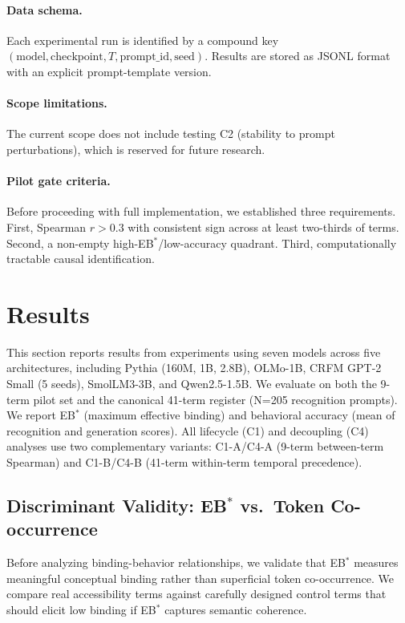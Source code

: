 \documentclass[10pt]{article} %
\begin{document}
\paragraph{Data schema.}
Each experimental run is identified by a compound key $(\text{model},\text{checkpoint},T,\text{prompt\_id},\text{seed})$.
Results are stored as JSONL format with an explicit prompt-template version.

\paragraph{Scope limitations.}
The current scope does not include testing C2 (stability to prompt perturbations), which is reserved for future research.

\paragraph{Pilot gate criteria.}
Before proceeding with full implementation, we established three requirements. First, Spearman $r>0.3$ with consistent sign across at least two-thirds of terms. Second, a non-empty high-EB$^*$/low-accuracy quadrant. Third, computationally tractable causal identification.

\section{Results}

This section reports results from experiments using seven models across five architectures, including Pythia (160M, 1B, 2.8B), OLMo-1B, CRFM GPT-2 Small (5 seeds), SmolLM3-3B, and Qwen2.5-1.5B.
We evaluate on both the 9-term pilot set and the canonical 41-term register (N=205 recognition prompts).
We report EB$^*$ (maximum effective binding) and behavioral accuracy (mean of recognition and generation scores).
All lifecycle (C1) and decoupling (C4) analyses use two complementary variants: C1-A/C4-A (9-term between-term Spearman) and C1-B/C4-B (41-term within-term temporal precedence).

\subsection{Discriminant Validity: EB$^*$ vs.\ Token Co-occurrence}

Before analyzing binding-behavior relationships, we validate that EB$^*$ measures meaningful conceptual binding rather than superficial token co-occurrence.
We compare real accessibility terms against carefully designed control terms that should elicit low binding if EB$^*$ captures semantic coherence.
\end{document}
